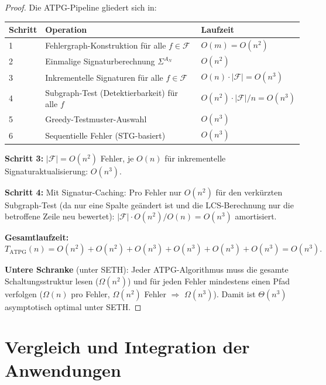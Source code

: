﻿\documentclass[a4paper,12pt]{article}
\theoremstyle{definition}
\begin{document}
\begin{proof}
  Die ATPG-Pipeline gliedert sich in:
  \begin{center}
  \begin{tabular}{lll}
    \toprule
    Schritt & Operation & Laufzeit \\
    \midrule
    1 & Fehlergraph-Konstruktion für alle $f \in \mathcal{F}$ & $O(m) = O(n^2)$ \\
    2 & Einmalige Signaturberechnung $\Sigma^{A_N}$ & $O(n^2)$ \\
    3 & Inkrementelle Signaturen für alle $f \in \mathcal{F}$ & $O(n) \cdot |\mathcal{F}| = O(n^3)$ \\
    4 & Subgraph-Test (Detektierbarkeit) für alle $f$  & $O(n^2) \cdot |\mathcal{F}|/n = O(n^3)$ \\
    5 & Greedy-Testmuster-Auswahl & $O(n^3)$ \\
    6 & Sequentielle Fehler (STG-basiert) & $O(n^3)$ \\
    \bottomrule
  \end{tabular}
  \end{center}

  \textbf{Schritt 3:} $|\mathcal{F}| = O(n^2)$ Fehler, je $O(n)$ für inkrementelle
  Signaturaktualisierung: $O(n^3)$.

  \textbf{Schritt 4:} Mit Signatur-Caching: Pro Fehler nur $O(n^2)$ für den verkürzten
  Subgraph-Test (da nur eine Spalte geändert ist und die LCS-Berechnung nur die
  betroffene Zeile neu bewertet): $|\mathcal{F}| \cdot O(n^2) / O(n) = O(n^3)$ amortisiert.

  \textbf{Gesamtlaufzeit:}
  \[
    T_{\text{ATPG}}(n) = O(n^2) + O(n^2) + O(n^3) + O(n^3) + O(n^3) + O(n^3) = O(n^3).
  \]

  \textbf{Untere Schranke} (unter SETH): Jeder ATPG-Algorithmus muss die gesamte
  Schaltungsstruktur lesen ($\Omega(n^2)$) und für jeden Fehler mindestens einen
  Pfad verfolgen ($\Omega(n)$ pro Fehler, $\Omega(n^2)$ Fehler $\Rightarrow$
  $\Omega(n^3)$). Damit ist $\Theta(n^3)$ asymptotisch optimal unter SETH.
\end{proof}

\section{Vergleich und Integration der Anwendungen}
\end{document}
